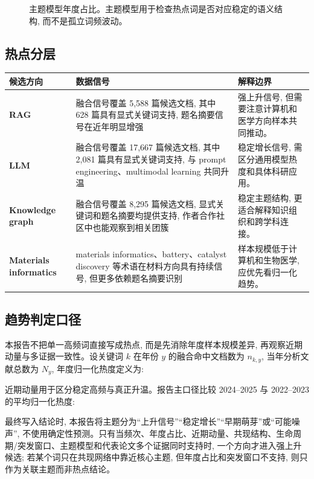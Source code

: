 \begin{figure}[!htbp]
  \centering
  \caption{主题模型年度占比。主题模型用于检查热点词是否对应稳定的语义结构, 而不是孤立词频波动。}
\end{figure}

\FloatBarrier

\subsection{热点分层}

\begin{tableblock}
\begin{tabularx}{\textwidth}{>{\bfseries}p{38mm}X X}
\toprule
候选方向 & 数据信号 & 解释边界 \\
\midrule
RAG & 融合信号覆盖 5,588 篇候选文档, 其中 628 篇具有显式关键词支持, 题名摘要信号在近年明显增强 & 强上升信号, 但需要注意计算机和医学方向样本共同推动。 \\
LLM & 融合信号覆盖 17,667 篇候选文档, 其中 2,081 篇具有显式关键词支持, 与 prompt engineering、multimodal learning 共同升温 & 稳定增长信号, 需区分通用模型热度和具体科研应用。 \\
Knowledge graph & 融合信号覆盖 8,295 篇候选文档, 显式关键词和题名摘要均提供支持, 作者合作社区中也能观察到相关团簇 & 稳定主题结构, 更适合解释知识组织和跨学科连接。 \\
Materials informatics & materials informatics、battery、catalyst discovery 等术语在材料方向具有持续信号, 但更多依赖题名摘要识别 & 样本规模低于计算机和生物医学, 应优先看归一化趋势。 \\
\bottomrule
\end{tabularx}
\end{tableblock}

\subsection{趋势判定口径}

本报告不把单一高频词直接写成热点, 而是先消除年度样本规模差异, 再观察近期动量与多证据一致性。设关键词 $k$ 在年份 $y$ 的融合命中文档数为 $n_{k,y}$, 当年分析文献总数为 $N_y$, 年度归一化热度定义为:

近期动量用于区分稳定高频与真正升温。报告主口径比较 2024--2025 与 2022--2023 的平均归一化热度:

最终写入结论时, 本报告将主题分为“上升信号”“稳定增长”“早期萌芽”或“可能噪声”, 不使用确定性预测。只有当频次、年度占比、近期动量、共现结构、生命周期/突发窗口、主题模型和代表论文多个证据同时支持时, 一个方向才进入强上升候选; 若某个词只在共现网络中靠近核心主题, 但年度占比和突发窗口不支持, 则只作为关联主题而非热点结论。
